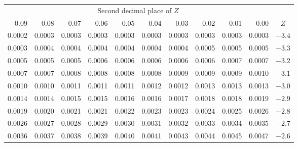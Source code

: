 \begin{table}[H]
\begin{center}
{\begin{tabular}{| rrrrr | rrrrr | c}
  \cline{1-10}
&&& \multicolumn{4}{c}{Second decimal place of $Z$} &&& \\
  \cline{1-10}
0.09 &  0.08 &  0.07 &  0.06 &  0.05 &  0.04 &  0.03 &  0.02 &  0.01 &  0.00 & $Z$  \\
  \hline
  \hline
\normalsize{0.0002} & \normalsize{0.0003} & \normalsize{0.0003} & \normalsize{0.0003} & \normalsize{0.0003} & \normalsize{0.0003} & \normalsize{0.0003} & \normalsize{0.0003} & \normalsize{0.0003} & \normalsize{0.0003} & $-3.4$ \\
  \normalsize{0.0003} & \normalsize{0.0004} & \normalsize{0.0004} & \normalsize{0.0004} & \normalsize{0.0004} & \normalsize{0.0004} & \normalsize{0.0004} & \normalsize{0.0005} & \normalsize{0.0005} & \normalsize{0.0005} & $-3.3$ \\
  \normalsize{0.0005} & \normalsize{0.0005} & \normalsize{0.0005} & \normalsize{0.0006} & \normalsize{0.0006} & \normalsize{0.0006} & \normalsize{0.0006} & \normalsize{0.0006} & \normalsize{0.0007} & \normalsize{0.0007} & $-3.2$ \\
  \normalsize{0.0007} & \normalsize{0.0007} & \normalsize{0.0008} & \normalsize{0.0008} & \normalsize{0.0008} & \normalsize{0.0008} & \normalsize{0.0009} & \normalsize{0.0009} & \normalsize{0.0009} & \normalsize{0.0010} & $-3.1$ \\
  \normalsize{0.0010} & \normalsize{0.0010} & \normalsize{0.0011} & \normalsize{0.0011} & \normalsize{0.0011} & \normalsize{0.0012} & \normalsize{0.0012} & \normalsize{0.0013} & \normalsize{0.0013} & \normalsize{0.0013} & $-3.0$ \\
    \hline
    \hline
  \normalsize{0.0014} & \normalsize{0.0014} & \normalsize{0.0015} & \normalsize{0.0015} & \normalsize{0.0016} & \normalsize{0.0016} & \normalsize{0.0017} & \normalsize{0.0018} & \normalsize{0.0018} & \normalsize{0.0019} & $-2.9$ \\
  \normalsize{0.0019} & \normalsize{0.0020} & \normalsize{0.0021} & \normalsize{0.0021} & \normalsize{0.0022} & \normalsize{0.0023} & \normalsize{0.0023} & \normalsize{0.0024} & \normalsize{0.0025} & \normalsize{0.0026} & $-2.8$ \\
  \normalsize{0.0026} & \normalsize{0.0027} & \normalsize{0.0028} & \normalsize{0.0029} & \normalsize{0.0030} & \normalsize{0.0031} & \normalsize{0.0032} & \normalsize{0.0033} & \normalsize{0.0034} & \normalsize{0.0035} & $-2.7$ \\
  \normalsize{0.0036} & \normalsize{0.0037} & \normalsize{0.0038} & \normalsize{0.0039} & \normalsize{0.0040} & \normalsize{0.0041} & \normalsize{0.0043} & \normalsize{0.0044} & \normalsize{0.0045} & \normalsize{0.0047} & $-2.6$ \\

\end{tabular}}
\end{center}
\end{table}
